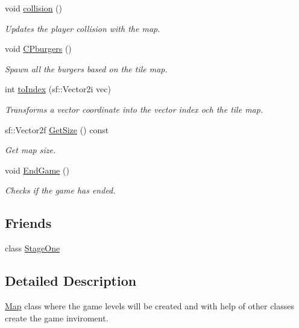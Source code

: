 \begin{DoxyCompactItemize}
void \mbox{\hyperlink{classMap_ae2311b25220590e05479d66408eeaabf}{collision}} ()
\begin{DoxyCompactList}\small\item\em Updates the player collision with the map. \end{DoxyCompactList}\item 
void \mbox{\hyperlink{classMap_a8485dce46ceae190bc9f51e22885eca3}{C\+Pburgers}} ()
\begin{DoxyCompactList}\small\item\em Spawn all the burgers based on the tile map. \end{DoxyCompactList}\item 
int \mbox{\hyperlink{classMap_a52f3ef46020dd2f6544fa2ee8dc9f4ff}{to\+Index}} (sf\+::\+Vector2i vec)
\begin{DoxyCompactList}\small\item\em Transforms a vector coordinate into the vector index och the tile map. \end{DoxyCompactList}\item 
sf\+::\+Vector2f \mbox{\hyperlink{classMap_a0c46c2c55236317c42854758b1af682f}{Get\+Size}} () const
\begin{DoxyCompactList}\small\item\em Get map size. \end{DoxyCompactList}\item 
void \mbox{\hyperlink{classMap_af58f98cfacd972d950201cc25df95982}{End\+Game}} ()
\begin{DoxyCompactList}\small\item\em Checks if the game has ended. \end{DoxyCompactList}\end{DoxyCompactItemize}
\subsection*{Friends}
\begin{DoxyCompactItemize}
\item 
class \mbox{\hyperlink{classMap_a8a97b6d5e408db103798551949a4e1f8}{Stage\+One}}
\end{DoxyCompactItemize}


\subsection{Detailed Description}
\mbox{\hyperlink{classMap}{Map}} class where the game levels will be created and with help of other classes create the game inviroment. 

